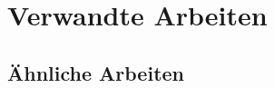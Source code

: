 \chapter{Verwandte Arbeiten}
\label{chap:intro}
\chapterstart
\section{Ähnliche Arbeiten}
\chapterend
